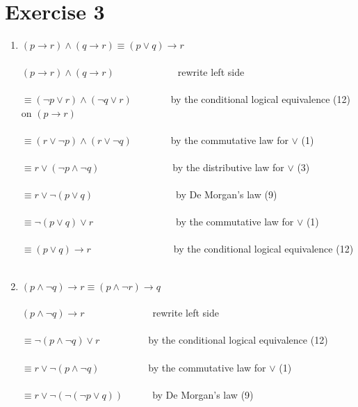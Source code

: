 \documentclass[a4paper,11pt]{article}
\begin{document}
\section*{Exercise 3}
\begin{enumerate}
    \item 
        $(p \rightarrow r) \wedge (q \rightarrow r) \equiv (p \vee q) \rightarrow r$\\\\
        $(p \rightarrow r) \wedge (q \rightarrow r)$~~~~~~~~~~~~~rewrite left side\\\\
        $\equiv (\neg p \vee r) \wedge (\neg q \vee r)$~~~~~~~~by the conditional logical equivalence (12) on $(p \rightarrow r)$\\\\
        $\equiv (r \vee \neg p) \wedge (r \vee \neg q)$~~~~~~~~by the commutative law for $\vee$ (1)\\\\
        $\equiv r \vee (\neg p \wedge \neg q)$~~~~~~~~~~~~~~~by the distributive law for $\vee$ (3)\\\\
        $\equiv r \vee \neg(p \vee q)$~~~~~~~~~~~~~~~~~by De Morgan's law (9)\\\\
        $\equiv \neg (p \vee q) \vee r$~~~~~~~~~~~~~~~~~by the commutative law for $\vee$ (1)\\\\
        $\equiv (p \vee q) \rightarrow r$~~~~~~~~~~~~~~~~~by the conditional logical equivalence (12)\\\\
    \item %
        $(p \wedge \neg q) \rightarrow r \equiv (p \wedge \neg r) \rightarrow q$\\\\
        $(p \wedge \neg q) \rightarrow r$~~~~~~~~~~~~~~rewrite left side\\\\
        $\equiv \neg (p \wedge \neg q) \vee r$~~~~~~~~~~by the conditional logical equivalence (12)\\\\
        $\equiv r \vee \neg (p \wedge \neg q)$~~~~~~~~~~by the commutative law for $\vee$ (1)\\\\
        $\equiv r \vee \neg (\neg (\neg p \vee q))$~~~~~~by De Morgan's law (9)\\\\

\end{enumerate}
\end{document}
